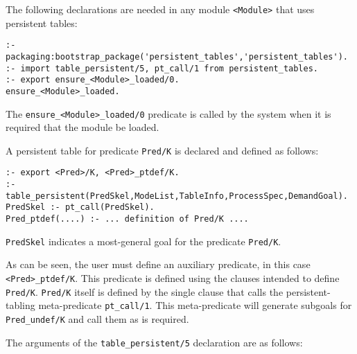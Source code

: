 The following declarations are needed in any module {\tt <Module>}
that uses persistent tables:

\begin{verbatim}
:- packaging:bootstrap_package('persistent_tables','persistent_tables').
:- import table_persistent/5, pt_call/1 from persistent_tables.
:- export ensure_<Module>_loaded/0.
ensure_<Module>_loaded.
\end{verbatim}

The {\tt ensure\_<Module>\_loaded/0} predicate is called by the system
when it is required that the module be loaded.

A persistent table for predicate {\tt Pred/K} is declared and defined as
follows:

\begin{verbatim}
:- export <Pred>/K, <Pred>_ptdef/K.
:- table_persistent(PredSkel,ModeList,TableInfo,ProcessSpec,DemandGoal).
PredSkel :- pt_call(PredSkel).
Pred_ptdef(....) :- ... definition of Pred/K ....
\end{verbatim}
	   
{\tt PredSkel} indicates a most-general goal for the predicate
{\tt Pred/K}.

As can be seen, the user must define an auxiliary predicate, in this
case {\tt <Pred>\_ptdef/K}.  This predicate is defined using the
clauses intended to define {\tt Pred/K}.  {\tt Pred/K} itself is
defined by the single clause that calls the persistent-tabling
meta-predicate {\tt pt\_call/1}.  This meta-predicate will generate
subgoals for {\tt Pred\_undef/K} and call them as is required.


The arguments of the {\tt table\_persistent/5} declaration are as
follows:

